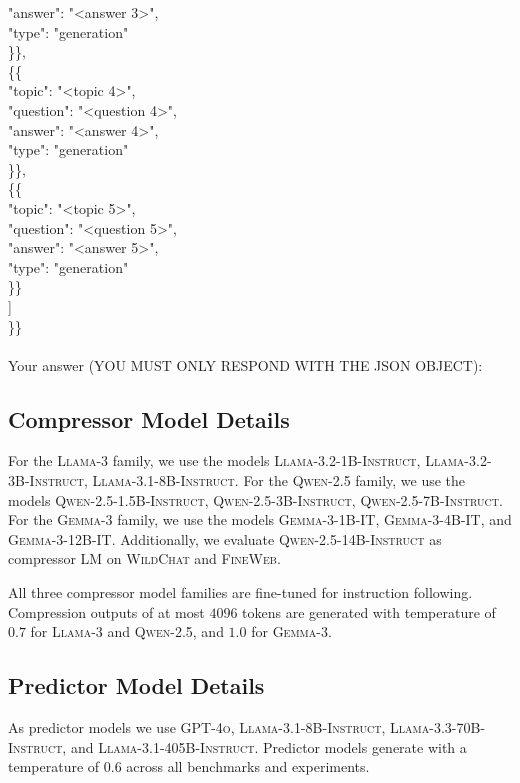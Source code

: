 \documentclass{article} %
\newcommand{\tab}{\hspace*{2em}}
\begin{document}
\begin{examplebox}
\tab \tab \tab"answer": "<answer 3>", \\
\tab \tab \tab"type": "generation" \\
\tab \tab \}\}, \\
\tab \tab \{\{ \\
\tab \tab \tab "topic": "<topic 4>", \\
\tab \tab \tab "question": "<question 4>", \\
\tab \tab \tab "answer": "<answer 4>", \\
\tab \tab \tab "type": "generation" \\
\tab \tab \}\}, \\
\tab \tab \{\{ \\
\tab \tab \tab "topic": "<topic 5>", \\
\tab \tab \tab "question": "<question 5>", \\
\tab \tab \tab "answer": "<answer 5>", \\
\tab \tab \tab "type": "generation" \\
\tab \tab \}\} \\
\tab ] \\
\}\}
\\\\
Your answer (YOU MUST ONLY RESPOND WITH THE JSON OBJECT):
\end{examplebox}



\subsection{Compressor Model Details}
\label{sec:appendix-compressor-model}

For the \textsc{Llama-3} family, we use the models \textsc{Llama-3.2-1B-Instruct}, \textsc{Llama-3.2-3B-Instruct}, \textsc{Llama-3.1-8B-Instruct}. For the \textsc{Qwen-2.5} family, we use the models \textsc{Qwen-2.5-1.5B-Instruct}, \textsc{Qwen-2.5-3B-Instruct}, \textsc{Qwen-2.5-7B-Instruct}. For the \textsc{Gemma-3} family, we use the models \textsc{Gemma-3-1B-IT}, \textsc{Gemma-3-4B-IT}, and \textsc{Gemma-3-12B-IT}. Additionally, we evaluate \textsc{Qwen-2.5-14B-Instruct} as compressor LM on \textsc{WildChat} and \textsc{FineWeb}. 

All three compressor model families are fine-tuned for instruction following. Compression outputs of at most $4096$ tokens are generated with temperature of $0.7$ for \textsc{Llama-3} and \textsc{Qwen-2.5}, and $1.0$ for \textsc{Gemma-3}. 

\subsection{Predictor Model Details}
\label{sec:appendix-supervisor-model}
As predictor models we use \textsc{GPT-4o}, \textsc{Llama-3.1-8B-Instruct}, \textsc{Llama-3.3-70B-Instruct}, and \textsc{Llama-3.1-405B-Instruct}. Predictor models generate with a temperature of $0.6$ across all benchmarks and experiments.
\end{document}
